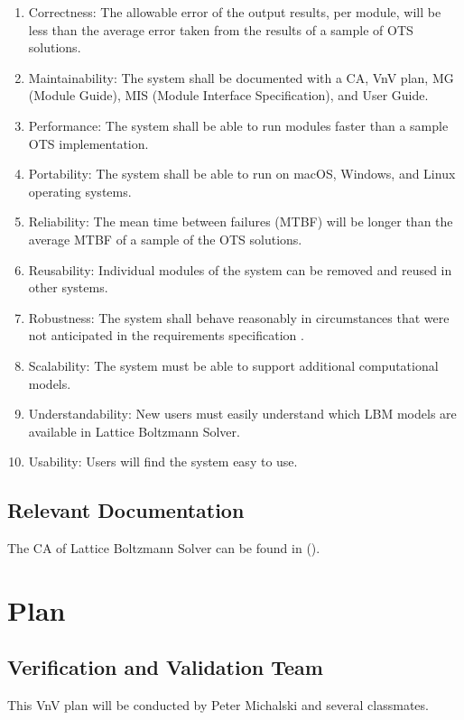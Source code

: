 \documentclass[12pt, titlepage]{article}
\newcommand{\famname}{Lattice Boltzmann Solver}
\begin{document}
\begin{enumerate}
\item Correctness: The allowable error of the output results, per module, will be less than the average error taken from the results of a sample of OTS solutions.
\item Maintainability: The system shall be documented with a CA, VnV plan, MG (Module Guide), MIS (Module Interface Specification), and User Guide.
\item Performance: The system shall be able to run modules faster than a sample OTS implementation.
\item Portability: The system shall be able to run on macOS, Windows, and Linux operating systems.
\item Reliability: The mean time between failures (MTBF) will be longer than the average MTBF of a sample of the OTS solutions.
\item Reusability: Individual modules of the system can be removed and reused in other systems.
\item Robustness: The system shall behave reasonably in circumstances that were not anticipated in the requirements specification \cite{ghezzi1991fundamentals}.
\item Scalability: The system must be able to support additional computational models.
\item Understandability: New users must easily understand which LBM models are available in {\famname}.
\item Usability: Users will find the system easy to use.
\end{enumerate}


\subsection{Relevant Documentation}

The CA of {\famname} can be found in (\citet{LBM_CA_PM}).\\ 

\newpage

\section{Plan}
\label{testplan}	
\subsection{Verification and Validation Team}

This VnV plan will be conducted by Peter Michalski and several classmates.
\end{document}
